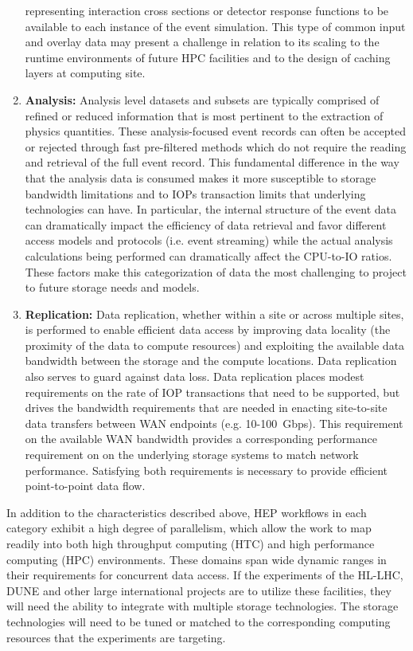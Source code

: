 \documentclass[12pt,a4paper]{article}
\begin{document}
\begin{enumerate}
  representing interaction cross sections or detector response functions
  to be available to each instance of the event simulation. This type of
  common input and overlay data may present a challenge in relation to
  its scaling to the runtime environments of future HPC facilities and
  to the design of caching layers at computing site.
\item \textbf{Analysis:} Analysis level datasets and subsets are typically
  comprised of refined or reduced information that is most pertinent to
  the extraction of physics quantities. These analysis-focused event
  records can often be accepted or rejected through fast pre-filtered
  methods which do not require the reading and retrieval of the full
  event record. This fundamental difference in the way that the analysis
  data is consumed makes it more susceptible to storage bandwidth
  limitations and to IOPs transaction limits that underlying
  technologies can have. In particular, the internal structure of the
  event data can dramatically impact the efficiency of data retrieval
  and favor different access models and protocols (i.e. event
  streaming) while the actual analysis calculations being performed can
  dramatically affect the CPU-to-IO ratios. These factors make this
  categorization of data the most challenging to project to future
  storage needs and models.
\item \textbf{Replication:} Data replication, whether within a site or
  across multiple sites, is performed to enable efficient data access by
  improving data locality (the proximity of the data to compute
  resources) and exploiting the available data bandwidth between the
  storage and the compute locations. Data replication also serves to
  guard against data loss. Data replication places modest requirements
  on the rate of IOP transactions that need to be supported, but drives
  the bandwidth requirements that are needed in enacting site-to-site
  data transfers between WAN endpoints (e.g. 10-100~Gbps). This
  requirement on the available WAN bandwidth provides a corresponding
  performance requirement on on the underlying storage systems to match
  network performance. Satisfying both requirements is necessary to
  provide efficient point-to-point data flow.
\end{enumerate}

In addition to the characteristics described above, HEP workflows in
each category exhibit a high degree of parallelism, which allow the work
to map readily into both high throughput computing (HTC) and high
performance computing (HPC) environments. These domains span wide
dynamic ranges in their requirements for concurrent data access. If the
experiments of the HL-LHC, DUNE and other large international projects
are to utilize these facilities, they will need the ability to integrate
with multiple storage technologies. The storage technologies will need
to be tuned or matched to the corresponding computing resources that the
experiments are targeting.
\end{document}
